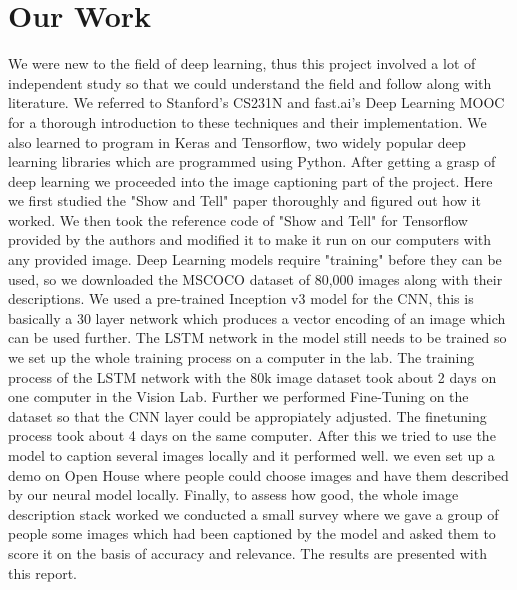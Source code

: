 \documentclass[11pt]{article}
\begin{document}
	\section{Our Work}
	
 We were new to the field of deep learning, thus this project involved a lot of independent study so that we could understand the field and follow along with literature. We referred to Stanford's CS231N \cite{cs231n} and fast.ai's Deep Learning MOOC\cite{fastai} for a thorough introduction to these techniques and their implementation. We also learned to program in Keras and Tensorflow, two widely popular deep learning libraries which are programmed using Python.  After getting a grasp of deep learning we proceeded into the image captioning part of the project. Here we first studied the "Show and Tell" paper\cite{showandtell} thoroughly and figured out how it worked. We then took the reference code of "Show and Tell" for Tensorflow provided by the authors and modified it to make it run on our computers with any provided image. Deep Learning models require "training" before they can be used, so we downloaded the MSCOCO \cite{mscoco} dataset of 80,000 images along with their descriptions. We used a pre-trained Inception v3  model for the CNN, this is basically a 30 layer network which produces a vector encoding of an image which can be used further. The LSTM network in the model still needs to be trained so we set up the whole training process on a computer in the lab. The training process of the LSTM network with the 80k image dataset took about 2 days on one computer in the Vision Lab. Further we performed Fine-Tuning on the dataset so that the CNN layer could be appropiately adjusted. The finetuning process took about 4 days on the same computer. After this we tried to use the model to caption several images locally and it performed well. we even set up a demo on Open House where people could choose images and have them described by our neural model locally. Finally, to assess how good, the whole image description stack worked we conducted a small survey where we gave a group of people some images which had been captioned by the model and asked them to score it on the basis of accuracy and relevance. The results are presented with this report.
\end{document}
